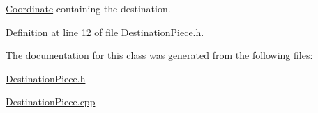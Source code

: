 \hyperlink{structCoordinate}{Coordinate} containing the destination. 



Definition at line 12 of file Destination\-Piece.\-h.



The documentation for this class was generated from the following files\-:\begin{DoxyCompactItemize}
\item 
\hyperlink{DestinationPiece_8h}{Destination\-Piece.\-h}\item 
\hyperlink{DestinationPiece_8cpp}{Destination\-Piece.\-cpp}\end{DoxyCompactItemize}
